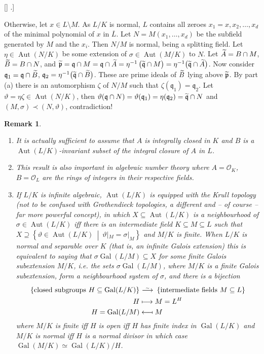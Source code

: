 \documentclass[DIV=14,parskip=full,pointednumbers]{scrartcl}
\newenvironment{alphanumerate}{\begin{enumerate}[label={$(\alph*)$},ref=\curthm]}{\end{enumerate}}
\theoremstyle{cthm}
\theoremstyle{cvarthm}
\renewenvironment{proof}[1][\proofname]
{\pushQED{\qed}\topsep0pt \partopsep0pt\trivlist\item[\hskip\labelsep\itshape #1.] }{\popQED\endtrivlist\addvspace{6pt plus 6pt}}
\theoremstyle{cdef}
\newtheorem*{rem*}{Remark}
\newcommand{\reff}[1]{%
	\edef\pretemp{\getrefnumber{#1}}%
	\StrLeft{\pretemp}{1}[\dummy]%
	\IfInteger{\dummy}{\def\temp{\pretemp}}{\def\temp{\detokenize\pretemp}}%
	\StrBehind{\temp}{\thesubsection.}[\tempcropped]%
	\IfBeginWith{\temp}{\thesubsection}{\hyperref[#1]{\tempcropped}} {\hyperref[#1]{\temp}}%
}
\newcommand{\Oo}{\mathcal{O}}
\newcommand{\pp}{\mathfrak{p}}
\newcommand{\qq}{\mathfrak{q}}
\newcommand{\Aut}{\operatorname{Aut}}
\newcommand{\Gal}{\operatorname{Gal}}
\newcommand{\ov}{\overline}
\newcommand{\snake}[1]{\widetilde{#1}\vphantom{\overrightarrow{#1}}}%
\newcommand{\isomorphism}{
	\tikz[baseline=(a.base)] \node (a) at (0,0) {$\longrightarrow$} node[above=-0.25ex] {\tiny $\sim$};}
\newcommand{\st}{\ \middle|\ }
\begin{document}
\begin{proof}[Proof of Theorem~\reff{thm:actsTransitively}]
\begin{alphanumerate}
			Otherwise, let $x\in L\setminus M$. As $L/K$ is normal, $L$ contains all zeroes $x_1=x,x_2,\ldots, x_d$ of the minimal polynomial of $x$ in $\ov L$. Let $N=M(x_1,\ldots,x_d)$ be the subfield generated by $M$ and the $x_i$. Then $N/M$ is normal, being a splitting field. Let $\eta\in \Aut(N/K)$ be some extension of $\sigma\in \Aut(M/K)$ to $N$. Let $\snake A = B\cap M$, $\snake B = B\cap N$, and $\snake\pp = \qq\cap M  =\qq\cap \snake A = \eta^{-1}\left(\snake \qq\cap M\right) = \eta^{-1}\big(\snake\qq\cap \snake A\big)$. Now consider $\qq_1=\qq\cap \snake B$, $\qq_2=\eta^{-1}\big(\snake \qq\cap\snake B\big)$. These are prime ideals of $\snake B$ lying above $\snake \pp$. By part (a) there is an automorphism $\zeta$ of $N/M$ such that $\zeta(\qq_1) = \qq_2$. Let $\vartheta = \eta\zeta\in \Aut(N/K)$, then $\vartheta(\qq\cap N) = \vartheta(\qq_1) = \eta(\qq_2) = \snake\qq\cap N$ and $(M,\sigma)\prec (N,\vartheta)$, contradiction!
		\end{alphanumerate}
	\end{proof}
	\begin{rem*}
		\begin{alphanumerate}
		\item
			It is actually sufficient to assume that $A$ is integrally closed in $K$ and $B$ is a $\Aut(L/K)$-invariant subset of the integral closure of $A$ in $L$.
		\item
			This result is also important in algebraic number theory where $A=\Oo_K$, $B=\Oo_L$ are the rings of integers in their respective fields. 
		\item If $L/K$ is infinite algebraic, $\Aut(L/K)$ is equipped with the \emph{Krull topology} (not to be confused with \emph{Grothendieck topologies}, a different and -- of course -- far more powerful concept), in which $X\subseteq \Aut(L/K)$ is a neighbourhood of $\sigma\in\Aut(L/K)$ iff there is an intermediate field $K\subseteq M\subseteq L$ such that $X\supseteq\left\{\vartheta \in \Aut(L/K)\st \vartheta|_M = \sigma|_M\right\}$ and $M/K$ is finite. When $L/K$ is normal and separable over $K$ (that is, an infinite Galois extension) this is equivalent to saying that $\sigma\Gal(L/M)\subseteq X$ for some finite Galois subextension $M/K$, i.e. the sets $\sigma\Gal(L/M)$, where $M/K$ is a finite Galois subextension, form a neighbourhood system of $\sigma$, and  there is a bijection 
		\begin{align*}
			\left\{\text{closed subgroups }H\subseteq \Gal(L/K)\right\}&\isomorphism\left\{\text{intermediate fields }M\subseteq L\right\}\\
			H&\longmapsto M= L^H\\
			H=\Gal(L/M) &\longmapsfrom M
		\end{align*}
		where $M/K$ is finite iff $H$ is open iff $H$ has finite index in $\Gal(L/K)$ and $M/K$ is normal iff $H$ is a normal divisor in which case $\Gal(M/K) \simeq \Gal(L/K)/H$.
		\end{alphanumerate}
	\end{rem*}
\end{document}

